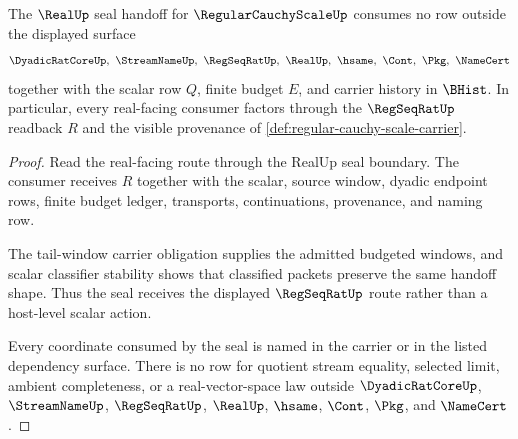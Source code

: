 \begin{theorem}
\label{thm:regular-cauchy-scale-real-seal-handoff-obligation}
The $\RealUp$ seal handoff for $\RegularCauchyScaleUp$ consumes no row outside the displayed surface
$$
\DyadicRatCoreUp,\ \StreamNameUp,\ \RegSeqRatUp,\ \RealUp,\ \hsame,\ \Cont,\ \Pkg,\ \NameCert
$$
together with the scalar row $Q$, finite budget $E$, and carrier history in $\BHist$. In particular, every real-facing consumer factors through the $\RegSeqRatUp$ readback $R$ and the visible provenance of \autoref{def:regular-cauchy-scale-carrier}.
\end{theorem}
\begin{proof}
Read the real-facing route through the RealUp seal boundary. The consumer receives $R$ together with the scalar, source window, dyadic endpoint rows, finite budget ledger, transports, continuations, provenance, and naming row.

The tail-window carrier obligation supplies the admitted budgeted windows, and scalar classifier stability shows that classified packets preserve the same handoff shape. Thus the seal receives the displayed $\RegSeqRatUp$ route rather than a host-level scalar action.

Every coordinate consumed by the seal is named in the carrier or in the listed dependency surface. There is no row for quotient stream equality, selected limit, ambient completeness, or a real-vector-space law outside $\DyadicRatCoreUp$, $\StreamNameUp$, $\RegSeqRatUp$, $\RealUp$, $\hsame$, $\Cont$, $\Pkg$, and $\NameCert$.
\end{proof}


